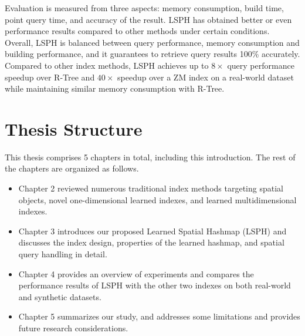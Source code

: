 Evaluation is measured from three aspects: memory consumption, build time, point query time, and accuracy of the result. LSPH has obtained better or even performance results compared to other methods under certain conditions. Overall, LSPH is balanced between query performance, memory consumption and building performance, and it guarantees to retrieve query results 100\% accurately. Compared to other index methods, LSPH achieves up to $8\times$ query performance speedup over R-Tree and $40\times$ speedup over a ZM index on a real-world dataset while maintaining similar memory consumption with R-Tree.  




\section{Thesis Structure}
This thesis comprises 5 chapters in total, including this introduction. The rest of the chapters are organized as follows. 
\begin{itemize}
    \item Chapter 2 reviewed numerous traditional index methods targeting spatial objects, novel one-dimensional learned indexes, and learned multidimensional indexes. 

    \item Chapter 3 introduces our proposed Learned Spatial Hashmap (LSPH) and discusses the index design, properties of the learned hashmap, and spatial query handling in detail. 

    \item Chapter 4 provides an overview of experiments and compares the performance results of LSPH with the other two indexes on both real-world and synthetic datasets. 

    \item Chapter 5 summarizes our study, and addresses some limitations and provides future research considerations. 

\end{itemize}